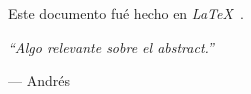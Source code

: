 \cleardoublepage  
\chapter*{\abstractname}
\label{chap:abstract}

Este documento fu\'{e} hecho en \emph{\LaTeX\ }.

\vspace{1cm}

\emph{``Algo relevante sobre el abstract.''}

\hfill --- Andr\'{e}s
